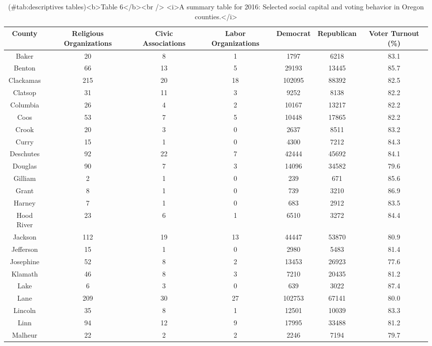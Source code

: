 \documentclass[
  english,
  man]{apa6}
\begin{document}
\begin{table}

\caption{(\#tab:descriptives tables)<b>Table 6</b><br /> <i>A summary table for 2016: Selected social capital and voting behavior in Oregon counties.</i>}
\centering
\begin{tabular}[t]{c|c|c|c|c|c|c}
\hline
County & Religious Organizations & Civic Associations & Labor Organizations & Democrat & Republican & Voter Turnout (\%)\\
\hline
Baker & 20 & 8 & 1 & 1797 & 6218 & 83.1\\
\hline
Benton & 66 & 13 & 5 & 29193 & 13445 & 85.7\\
\hline
Clackamas & 215 & 20 & 18 & 102095 & 88392 & 82.5\\
\hline
Clatsop & 31 & 11 & 3 & 9252 & 8138 & 82.2\\
\hline
Columbia & 26 & 4 & 2 & 10167 & 13217 & 82.2\\
\hline
Coos & 53 & 7 & 5 & 10448 & 17865 & 82.2\\
\hline
Crook & 20 & 3 & 0 & 2637 & 8511 & 83.2\\
\hline
Curry & 15 & 1 & 0 & 4300 & 7212 & 84.3\\
\hline
Deschutes & 92 & 22 & 7 & 42444 & 45692 & 84.1\\
\hline
Douglas & 90 & 7 & 3 & 14096 & 34582 & 79.6\\
\hline
Gilliam & 2 & 1 & 0 & 239 & 671 & 85.6\\
\hline
Grant & 8 & 1 & 0 & 739 & 3210 & 86.9\\
\hline
Harney & 7 & 1 & 0 & 683 & 2912 & 83.5\\
\hline
Hood River & 23 & 6 & 1 & 6510 & 3272 & 84.4\\
\hline
Jackson & 112 & 19 & 13 & 44447 & 53870 & 80.9\\
\hline
Jefferson & 15 & 1 & 0 & 2980 & 5483 & 81.4\\
\hline
Josephine & 52 & 8 & 2 & 13453 & 26923 & 77.6\\
\hline
Klamath & 46 & 8 & 3 & 7210 & 20435 & 81.2\\
\hline
Lake & 6 & 3 & 0 & 639 & 3022 & 87.4\\
\hline
Lane & 209 & 30 & 27 & 102753 & 67141 & 80.0\\
\hline
Lincoln & 35 & 8 & 1 & 12501 & 10039 & 83.3\\
\hline
Linn & 94 & 12 & 9 & 17995 & 33488 & 81.2\\
\hline
Malheur & 22 & 2 & 2 & 2246 & 7194 & 79.7\\

\end{tabular}
\end{table}
\end{document}
